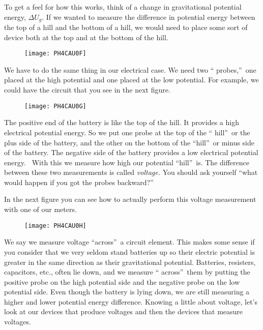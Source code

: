 To get a feel for how this works, think of a change in gravitational
potential energy, $\Delta U_{g}$. If we wanted to measure the difference in
potential energy between the top of a hill and the bottom of a hill, we
would need to place some sort of device both at the top and at the bottom of
the hill. \begin{figure}[h!]
\texttt{[image: PH4CAU0F]}
\end{figure}We have to do the same thing in
our electrical case. We need two \textquotedblleft
probes,\textquotedblright\ one placed at the high potential and one placed
at the low potential. For example, we could have the circuit that you see in
the next figure.\begin{figure}[h!]
\texttt{[image: PH4CAU0G]}
\end{figure}The positive end of the battery
is like the top of the hill. It provides a high electrical potential energy.
So we put one probe at the top of the \textquotedblleft
hill\textquotedblright\ or the plus side of the battery, and the other on
the bottom of the \textquotedblleft hill\textquotedblright\ or minus side of
the battery. The negative side of the battery provides a low electrical
potential energy. \emph{\ }With this we measure how high our potential
\textquotedblleft hill\textquotedblright\ is. The difference between these
two measurements is called \emph{voltage. }You should ask yourself
\textquotedblleft what would happen if you got the probes
backward?\textquotedblright\ 

In the next figure you can see how to actually perform this voltage
measurement with one of our meters.\begin{figure}[h!]
\texttt{[image: PH4CAU0H]}
\end{figure}

We say we measure voltage \textquotedblleft across\textquotedblright\ a
circuit element. This makes some sense if you consider that we very seldom
stand batteries up so their electric potential is greater in the same
direction as their gravitational potential. Batteries, resisters,
capacitors, etc., often lie down, and we measure \textquotedblleft
across\textquotedblright\ them by putting the positive probe on the high
potential side and the negative probe on the low potential side. Even though
the battery is lying down, we are still measuring a higher and lower
potential energy difference. Knowing a little about voltage, let's look at
our devices that produce voltages and then the devices that measure voltages.

